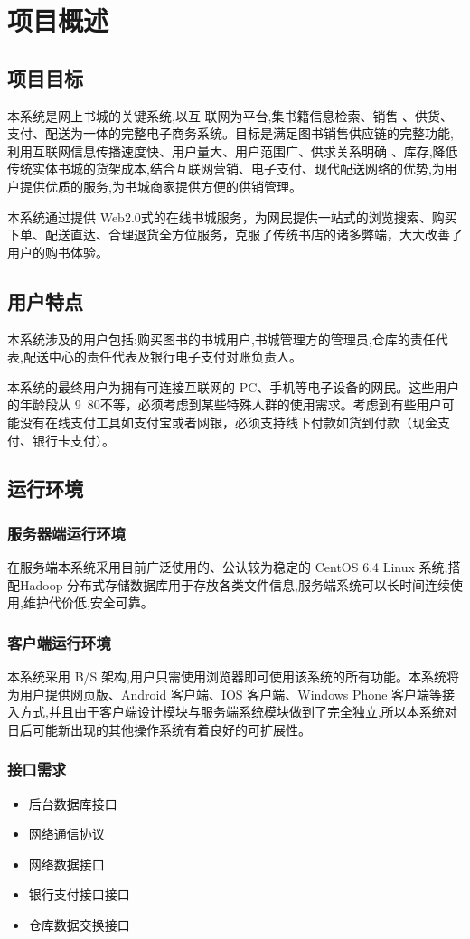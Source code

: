 \chapter{项目概述}
\section{项目目标}
本系统是网上书城的关键系统,以互 联网为平台,集书籍信息检索、销售 、供货、支付、配送为一体的完整电子商务系统。目标是满足图书销售供应链的完整功能,利用互联网信息传播速度快、用户量大、用户范围广、供求关系明确 、库存,降低传统实体书城的货架成本,结合互联网营销、电子支付、现代配送网络的优势,为用户提供优质的服务,为书城商家提供方便的供销管理。

本系统通过提供 Web2.0式的在线书城服务，为网民提供一站式的浏览搜索、购买下单、配送直达、合理退货全方位服务，克服了传统书店的诸多弊端，大大改善了用户的购书体验。
\section{用户特点}
本系统涉及的用户包括:购买图书的书城用户,书城管理方的管理员,仓库的责任代表,配送中心的责任代表及银行电子支付对账负责人。

本系统的最终用户为拥有可连接互联网的 PC、手机等电子设备的网民。这些用户的年龄段从 9~80不等，必须考虑到某些特殊人群的使用需求。考虑到有些用户可能没有在线支付工具如支付宝或者网银，必须支持线下付款如货到付款（现金支付、银行卡支付）。
\section{运行环境}
\subsection{服务器端运行环境}
在服务端本系统采用目前广泛使用的、公认较为稳定的 CentOS 6.4 Linux 系统,搭配Hadoop 分布式存储数据库用于存放各类文件信息,服务端系统可以长时间连续使用,维护代价低,安全可靠。
\subsection{客户端运行环境}
本系统采用 B/S 架构,用户只需使用浏览器即可使用该系统的所有功能。本系统将为用户提供网页版、Android 客户端、IOS 客户端、Windows Phone 客户端等接入方式,并且由于客户端设计模块与服务端系统模块做到了完全独立,所以本系统对日后可能新出现的其他操作系统有着良好的可扩展性。
\subsection{接口需求}
\begin{itemize}
	\item 后台数据库接口
	\item 网络通信协议
	\item 网络数据接口
	\item 银行支付接口接口
	\item 仓库数据交换接口
\end{itemize}
